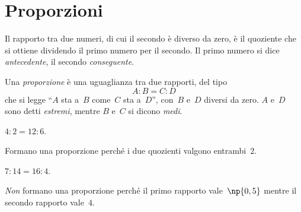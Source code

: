 \ovalbox{\risolvii \ref{ese:3.85}, \ref{ese:3.86}, \ref{ese:3.87}, \ref{ese:3.88}, \ref{ese:3.89}, \ref{ese:3.90},
\ref{ese:3.91}, \ref{ese:3.92}, \ref{ese:3.93}, \ref{ese:3.94}, \ref{ese:3.95}, \ref{ese:3.96},
\ref{ese:3.97}, \ref{ese:3.98},}

\vspazio\ovalbox{\ref{ese:3.99}, \ref{ese:3.100}, \ref{ese:3.101}, \ref{ese:3.102}, \ref{ese:3.103}, \ref{ese:3.104},
\ref{ese:3.105}, \ref{ese:3.106}, \ref{ese:3.107}, \ref{ese:3.108}, \ref{ese:3.109}, \ref{ese:3.110}, \ref{ese:3.111},
\ref{ese:3.112},}

\vspazio\ovalbox{\ref{ese:3.113}, \ref{ese:3.114}, \ref{ese:3.115}, \ref{ese:3.116}}

\section{Proporzioni}

\begin{definizione}
 Il rapporto tra due numeri, di cui il secondo è diverso da zero, è il quoziente che si ottiene dividendo
il primo numero per il secondo. Il primo numero si dice \emph{antecedente}, il secondo \emph{conseguente}.
\end{definizione}

\begin{center}
  
\end{center}

\begin{definizione}
 Una \emph{proporzione} è una uguaglianza tra due rapporti, del tipo
\[A: B = C: D\]
che si legge ``$A$ sta a~$B$ come~$C$ sta a~$D$'', con~$B$ e~$D$ diversi da zero. $A$ e~$D$ sono detti \emph{estremi}, mentre $B$ e~$C$ si dicono \emph{medi}.
\end{definizione}

\begin{center}
  
\end{center}

\begin{exrig}
 \begin{esempio}
  $4:2=12:6$.

Formano una proporzione perché i due quozienti valgono entrambi~$2$.
 \end{esempio}

\begin{esempio}
$7:14=16:4$.

 \emph{Non} formano una proporzione perché il primo rapporto vale~$\np{0,5}$ mentre il secondo rapporto vale~$4$.
\end{esempio}
\end{exrig}

